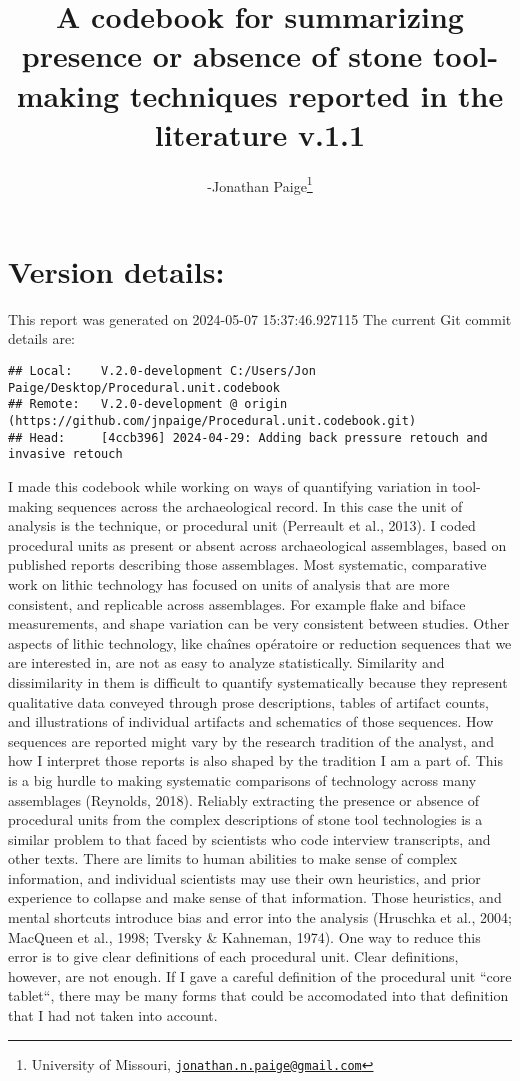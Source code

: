 \documentclass[
]{article}
\title{A codebook for summarizing presence or absence of stone
tool-making techniques reported in the literature v.1.1}
\author{-Jonathan Paige\footnote{University of Missouri,
  \href{mailto:jonathan.n.paige@gmail.com}{\nolinkurl{jonathan.n.paige@gmail.com}}}}
\date{}
\begin{document}
\maketitle

{
\setcounter{tocdepth}{3}
\tableofcontents
}
\hypertarget{version-details}{%
\section{Version details:}\label{version-details}}

This report was generated on 2024-05-07 15:37:46.927115 The current Git
commit details are:

\begin{verbatim}
## Local:    V.2.0-development C:/Users/Jon Paige/Desktop/Procedural.unit.codebook
## Remote:   V.2.0-development @ origin (https://github.com/jnpaige/Procedural.unit.codebook.git)
## Head:     [4ccb396] 2024-04-29: Adding back pressure retouch and invasive retouch
\end{verbatim}

I made this codebook while working on ways of quantifying variation in
tool-making sequences across the archaeological record. In this case the
unit of analysis is the technique, or procedural unit (Perreault et al.,
2013). I coded procedural units as present or absent across
archaeological assemblages, based on published reports describing those
assemblages. Most systematic, comparative work on lithic technology has
focused on units of analysis that are more consistent, and replicable
across assemblages. For example flake and biface measurements, and shape
variation can be very consistent between studies. Other aspects of
lithic technology, like chaînes opératoire or reduction sequences that
we are interested in, are not as easy to analyze statistically.
Similarity and dissimilarity in them is difficult to quantify
systematically because they represent qualitative data conveyed through
prose descriptions, tables of artifact counts, and illustrations of
individual artifacts and schematics of those sequences. How sequences
are reported might vary by the research tradition of the analyst, and
how I interpret those reports is also shaped by the tradition I am a
part of. This is a big hurdle to making systematic comparisons of
technology across many assemblages (Reynolds, 2018). Reliably extracting
the presence or absence of procedural units from the complex
descriptions of stone tool technologies is a similar problem to that
faced by scientists who code interview transcripts, and other texts.
There are limits to human abilities to make sense of complex
information, and individual scientists may use their own heuristics, and
prior experience to collapse and make sense of that information. Those
heuristics, and mental shortcuts introduce bias and error into the
analysis (Hruschka et al., 2004; MacQueen et al., 1998; Tversky \&
Kahneman, 1974). One way to reduce this error is to give clear
definitions of each procedural unit. Clear definitions, however, are not
enough. If I gave a careful definition of the procedural unit ``core
tablet``, there may be many forms that could be accomodated into that
definition that I had not taken into account.
\end{document}
